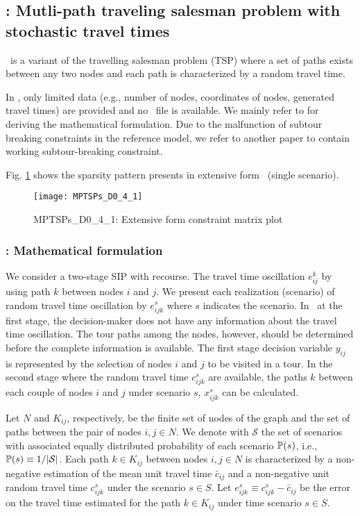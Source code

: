\subsection{\mptsps: Mutli-path traveling salesman problem with stochastic travel times} \label{MPTSPs}
\mptsps\ is a variant of the travelling salesman problem (TSP) where a set of paths exists between any two nodes and each path is characterized by a random travel time. 

In \siplib, only limited data (e.g., number of nodes, coordinates of nodes, generated travel times) are provided and no \smps\ file is available. We mainly refer to \cite{journal:PGM2017} for deriving the mathematical formulation. Due to the malfunction of subtour breaking constraints in the reference model, we refer to another paper \cite{journal:LSD1990} to contain working subtour-breaking constraint.

Fig. \ref{fig:mptsps_sparsity} shows the sparsity pattern presents in extensive form \mptsps\ (single scenario).
\begin{figure}[]
	\centering
	\texttt{[image: MPTSPs\_D0\_4\_1]}
	\caption{MPTSPs\_D0\_4\_1: Extensive form constraint matrix plot}
	\label{fig:mptsps_sparsity}
\end{figure}

\subsubsection{\mptsps: Mathematical formulation}
We consider a two-stage SIP with recourse. The travel time oscillation $e_{ij}^k$ by using path $k$ between nodes $i$ and $j$. We present each realization (scenario) of random travel time oscillation by $e_{ijk}^{s}$ where $s$ indicates the scenario. In \mptsps\, at the first stage, the decision-maker does not have any information about the travel time oscillation. The tour paths among the nodes, however, should be determined before the complete information is available. The first stage decision variable $y_{ij}$ is represented by the selection of nodes $i$ and $j$ to be visited in a tour. In the second stage where the random travel time $c_{ijk}^{s}$ are available, the paths $k$ between each couple of nodes $i$ and $j$ under scenario $s$, $x_{ijk}^{s}$ can be calculated. 

Let $N$ and $K_{ij}$, respectively, be the finite set of nodes of the graph and the set of paths between the pair of nodes $i,j\in N$. We denote with $\mathcal{S}$ the set of scenarios with associated equally distributed probability of each scenario $\operatorname*{\mathbb{P}}(s)$, i.e., $\operatorname*{\mathbb{P}}(s)\equiv 1/|\mathcal{S}|$. Each path $k\in K_{ij}$ between nodes $i,j\in N$ is characterized by a non-negative estimation of the mean unit travel time $\bar{c}_{ij}$ and a non-negative unit random travel time $c_{ijk}^{s}$ under the scenario $s\in S$. Let $e_{ijk}^{s}\equiv c_{ijk}^{s}-\bar{c}_{ij}$ be the error on the travel time estimated for the path $k\in K_{ij}$ under time scenario $s\in S$.

